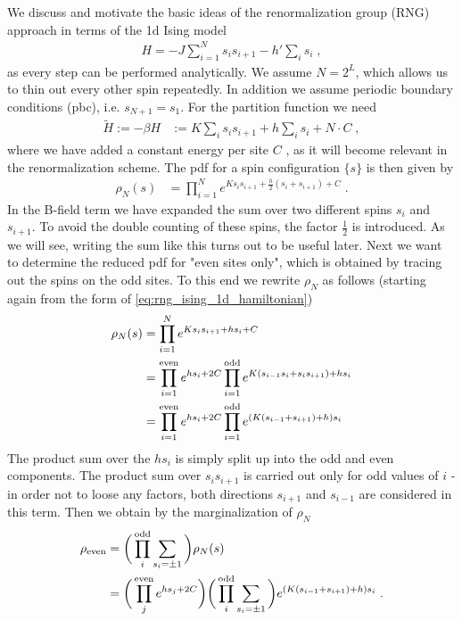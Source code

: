 We discuss and motivate the basic ideas of the renormalization group (RNG) approach in terms of the 1d Ising model  
%
\begin{align}\label{eq:}
  H = -J \sum_{ i =1}^{N} s_{i}s_{i+1}
  - h' \sum_{i} s_{i} \;,
\end{align}
%
as every step can be performed analytically.
We assume $N=2^{L}$, which allows us to 
thin out every other spin repeatedly. In addition we assume periodic boundary conditions (pbc), i.e. $s_{N+1}=s_{1}$.
For the partition function we need
\begin{align}\label{eq:rng_ising_1d_hamiltonian}
\tilde H := - \beta H &:= 
K\sum_{i} s_{i}s_{i+1} + 
h\sum_{i} s_{i} + N \cdot C\;,
\end{align}
where we have added a constant energy  per site $C$ , as it will become relevant in the renormalization scheme.
The pdf for a spin configuration $\{s\}$ is then given by
\begin{align}\label{eq:RNG:Z}
\rho_{N}(s) &= 
\prod_{i=1}^{N}
e^{K s_{i}s_{i+1} + \frac{h}{2} (s_{i}+s_{i+1}) + C}\;.
\end{align}
In the B-field term we have expanded the sum over two different spins $s_i$ and $s_{i+1}$. To avoid the double counting of these spins, the factor $\frac{1}{2}$ is introduced. As we will see, writing the sum like this turns out to be useful later.
Next we want to determine the reduced pdf for "even sites only", which is obtained by   tracing out the  spins on the odd sites. To this end we rewrite $\rho_{N}$ as follows (starting again from the form of \autoref{eq:rng_ising_1d_hamiltonian})
\begin{align}
\rho_{N}(s) &=\prod_{i=1}^{N} e^{K s_{i}s_{i+1} + hs_{i} + C}\\
&=\prod_{i=1}^\text{even} e^{hs_{i} + 2C}
\prod_{i=1}^\text{odd} e^{K \qty(s_{i-1}s_{i} + s_{i}s_{i+1}) + hs_{i} }
\\
&=\prod_{i=1}^\text{even} e^{hs_{i} + 2C}
\prod_{i=1}^\text{odd} e^{\qty(K \qty(s_{i-1} + s_{i+1}) + h) s_{i} }
\end{align}
%
The product sum over the $hs_i$ is simply split up into the odd and even components. The product sum over $s_is_{i+1}$ is carried out only for odd values of $i$ - in order not to loose any factors, both directions $s_{i+1}$ and $s_{i-1}$ are considered in this term.
Then we obtain by the marginalization of $\rho_N$
\begin{align}\label{eq:RNG:Z2}
\rho_\text{even} &= 
\bigg( \prod_{i}^\text{odd}\sum_{s_{i}=\pm 1}
\bigg)
\rho_N(s)\\
&=\bigg( \prod_{j}^\text{even} e^{h s_{j} + 2 C}   \bigg)
\bigg( \prod_{i}^\text{odd}\sum_{s_{i}=\pm 1}
\bigg)
e^{\qty(K (s_{i-1}+ s_{i+1}) + h )s_{i}}
\;.
\end{align}
